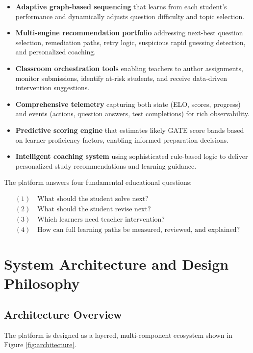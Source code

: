 \documentclass[sigconf,authordraft,twoside]{acmart}
\begin{document}
\begin{itemize}
\item \textbf{Adaptive graph-based sequencing} that learns from each student's performance and dynamically adjusts question difficulty and topic selection.
\item \textbf{Multi-engine recommendation portfolio} addressing next-best question selection, remediation paths, retry logic, suspicious rapid guessing detection, and personalized coaching.
\item \textbf{Classroom orchestration tools} enabling teachers to author assignments, monitor submissions, identify at-risk students, and receive data-driven intervention suggestions.
\item \textbf{Comprehensive telemetry} capturing both state (ELO, scores, progress) and events (actions, question answers, test completions) for rich observability.
\item \textbf{Predictive scoring engine} that estimates likely GATE score bands based on learner proficiency factors, enabling informed preparation decisions.
\item \textbf{Intelligent coaching system} using sophisticated rule-based logic to deliver personalized study recommendations and learning guidance.
\end{itemize}

The platform answers four fundamental educational questions:

\begin{equation}
\boxed{\begin{array}{l}
(1) \quad \text{What should the student solve next?} \\
(2) \quad \text{What should the student revise next?} \\
(3) \quad \text{Which learners need teacher intervention?} \\
(4) \quad \text{How can full learning paths be measured, reviewed, and explained?}
\end{array}}
\end{equation}

\section{System Architecture and Design Philosophy}

\subsection{Architecture Overview}
The platform is designed as a layered, multi-component ecosystem shown in Figure \ref{fig:architecture}.
\end{document}
